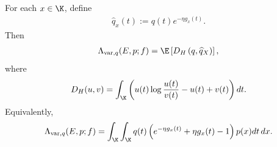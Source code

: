 \begin{proposition}
\label{prop:appendix_generalized_kl_form}
For each $x \in \K$, define
\begin{align}
    \widehat q_x(t) := q(t)e^{-\eta g_x(t)}.
    \label{eq:appendix_qhat_def}
\end{align}
Then
\begin{align}
    \Lambda_{\mathrm{var}, q}(E, p; f)
    =
    \E\left[D_H\left(q, \widehat q_X\right)\right],
    \label{eq:appendix_generalized_kl_identity}
\end{align}
where
\begin{align}
    D_H(u,v) = \int_\K \left(u(t)\log\frac{u(t)}{v(t)} - u(t) + v(t)\right)dt.
    \label{eq:appendix_generalized_kl_formula}
\end{align}
Equivalently,
\begin{align}
    \Lambda_{\mathrm{var}, q}(E, p; f)
    =
    \int_\K\int_\K q(t)\left(e^{-\eta g_x(t)} + \eta g_x(t) - 1\right)p(x)dt\,dx.
    \label{eq:appendix_lambda_var_integral_formula}
\end{align}
\end{proposition}

